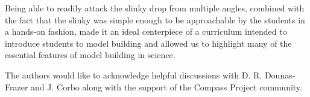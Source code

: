 \documentclass[prb,preprint]{revtex4-1}
\begin{document}
Being able to readily attack the slinky drop from multiple angles, combined with
the fact that the slinky was simple enough to be approachable by the students
in a hands-on fashion, made it an ideal centerpiece of a curriculum intended to
introduce students to model building and allowed us to highlight many of the
essential features of model building in science.


\acknowledgments The authors would like to acknowledge helpful discussions with
D. R. Dounas-Frazer and J. Corbo along with the support of the Compass Project
community.


\end{document}
